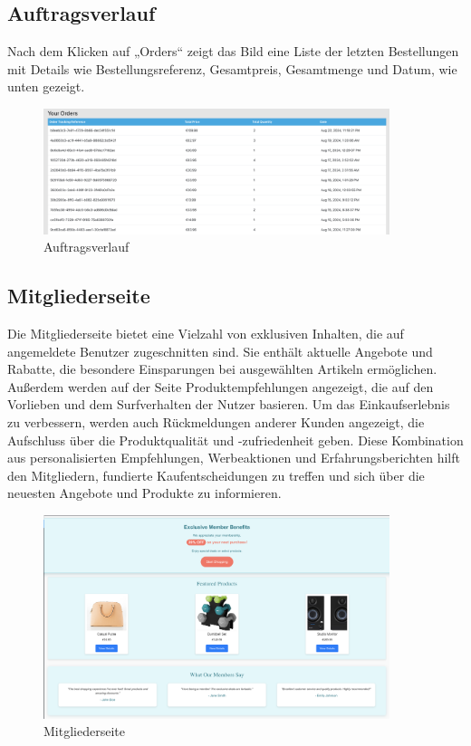  \subsection{Auftragsverlauf}

Nach dem Klicken auf „Orders“ zeigt das Bild eine Liste der letzten Bestellungen mit Details wie Bestellungsreferenz, Gesamtpreis, Gesamtmenge und Datum, wie unten gezeigt.


\begin{figure}[H]  
	\centering %
	\includegraphics[width=0.9\textwidth]{Images/Orders-History.png} 
	\caption{Auftragsverlauf} 
	\label{fig:sample8-image} 
\end{figure}

 \subsection{Mitgliederseite}

Die Mitgliederseite bietet eine Vielzahl von exklusiven Inhalten, die auf angemeldete Benutzer zugeschnitten sind. Sie enthält aktuelle Angebote und Rabatte, die besondere Einsparungen bei ausgewählten Artikeln ermöglichen. Außerdem werden auf der Seite Produktempfehlungen angezeigt, die auf den Vorlieben und dem Surfverhalten der Nutzer basieren. Um das Einkaufserlebnis zu verbessern, werden auch Rückmeldungen anderer Kunden angezeigt, die Aufschluss über die Produktqualität und -zufriedenheit geben. Diese Kombination aus personalisierten Empfehlungen, Werbeaktionen und Erfahrungsberichten hilft den Mitgliedern, fundierte Kaufentscheidungen zu treffen und sich über die neuesten Angebote und Produkte zu informieren.\\


\begin{figure}[H]  
	\centering %
	\includegraphics[width=0.9\textwidth]{Images/Member.png} 
	\caption{Mitgliederseite} 
	\label{fig:sample9-image} 
\end{figure}

